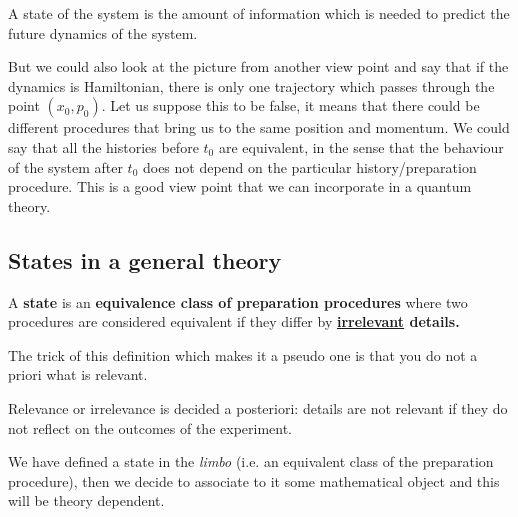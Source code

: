 \documentclass[../main.tex]{subfiles}
\begin{document}
\begin{definition}
A state of the system is the amount of information which is needed to predict the future dynamics of the system.
\end{definition}
But we could also look at the picture from another view point and say that if the dynamics is Hamiltonian, there is only one trajectory which passes through the point $(x_0,p_0)$. Let us suppose this to be false, it means that there could be different procedures that bring us to the same position and momentum. We could say that all the histories before $t_0$ are equivalent, in the sense that the behaviour of the system after $t_0$ does not depend on the particular history/preparation procedure. This is a good view point that we can incorporate in a quantum theory.
\subsection{States in a general theory}
\begin{definition}
A \textbf{state} is an \textbf{equivalence class of preparation procedures} where two procedures are considered  equivalent if they differ by \textbf{\underline{irrelevant} details.}
\end{definition}
The trick of this definition which makes it a pseudo one is that you do not a priori what is relevant.
\begin{kaobox}[frametitle=Remark]
Relevance or irrelevance is decided a posteriori: details are not relevant if they do not reflect on the outcomes of the experiment.
\end{kaobox}
We have defined a state in the \textit{limbo} (i.e. an equivalent class of the preparation procedure), then we decide to associate to it some mathematical object and this will be theory dependent.
\end{document}
